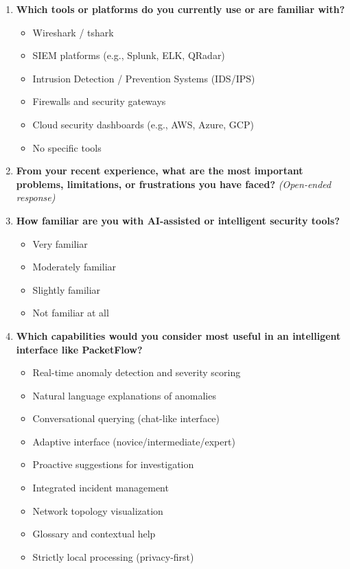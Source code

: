 \documentclass[
    11pt, 
    a4paper, 
    parskip=half, 
    headsepline,       %
    DIV=12             %
]{scrartcl}
\begin{document}
\begin{enumerate}[label=\textbf{\arabic*.}]
    \item \textbf{Which tools or platforms do you currently use or are familiar with?}
    \begin{itemize}[label=$\circ$, nosep]
        \item Wireshark / tshark
        \item SIEM platforms (e.g., Splunk, ELK, QRadar)
        \item Intrusion Detection / Prevention Systems (IDS/IPS)
        \item Firewalls and security gateways
        \item Cloud security dashboards (e.g., AWS, Azure, GCP)
        \item No specific tools
    \end{itemize}

    \item \textbf{From your recent experience, what are the most important problems, limitations, or frustrations you have faced?}
    \newline \textit{(Open-ended response)}

    \item \textbf{How familiar are you with AI-assisted or intelligent security tools?}
    \begin{itemize}[label=$\circ$, nosep]
        \item Very familiar
        \item Moderately familiar
        \item Slightly familiar
        \item Not familiar at all
    \end{itemize}

    \item \textbf{Which capabilities would you consider most useful in an intelligent interface like PacketFlow?}
    \begin{itemize}[label=$\circ$, nosep]
        \item Real-time anomaly detection and severity scoring
        \item Natural language explanations of anomalies
        \item Conversational querying (chat-like interface)
        \item Adaptive interface (novice/intermediate/expert)
        \item Proactive suggestions for investigation
        \item Integrated incident management
        \item Network topology visualization
        \item Glossary and contextual help
        \item Strictly local processing (privacy-first)
    \end{itemize}


\end{enumerate}
\end{document}
